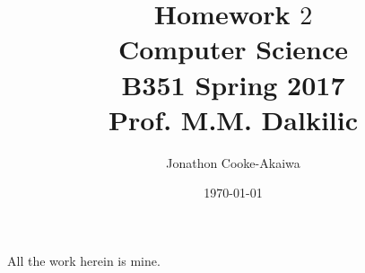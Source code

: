 \documentclass{article}
\begin{document}
\title{Homework $2$\\ Computer Science \\ B351 Spring 2017\\ Prof. M.M. Dalkilic}         %
\author{Jonathon Cooke-Akaiwa}        %
\date{\today}          %
\maketitle


\makeatother     %




\pagestyle{plain}
All the work herein is mine.
\end{document}
